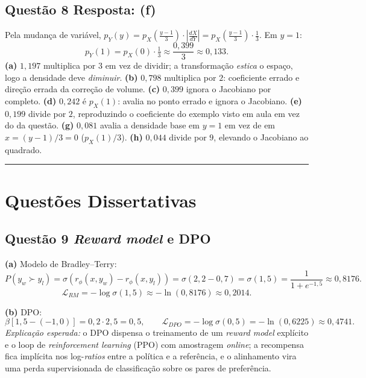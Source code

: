 \documentclass[11pt,a4paper]{article}
\begin{document}
\subsection*{Questão 8 \textemdash{} Resposta: (f)}
Pela mudança de variável, $p_Y(y) = p_X\!\left(\tfrac{y - 1}{3}\right) \cdot \left|\tfrac{dX}{dY}\right| = p_X\!\left(\tfrac{y - 1}{3}\right) \cdot \tfrac{1}{3}$. Em $y = 1$:
\[
p_Y(1) = p_X(0) \cdot \tfrac{1}{3} \approx \frac{0{,}399}{3} \approx 0{,}133.
\]
\textbf{(a)} $1{,}197$ multiplica por $3$ em vez de dividir; a transformação \emph{estica} o espaço, logo a densidade deve \emph{diminuir}.
\textbf{(b)} $0{,}798$ multiplica por $2$: coeficiente errado e direção errada da correção de volume.
\textbf{(c)} $0{,}399$ ignora o Jacobiano por completo.
\textbf{(d)} $0{,}242$ é $p_X(1)$: avalia no ponto errado e ignora o Jacobiano.
\textbf{(e)} $0{,}199$ divide por $2$, reproduzindo o coeficiente do exemplo visto em aula em vez do da questão.
\textbf{(g)} $0{,}081$ avalia a densidade base em $y = 1$ em vez de em $x = (y-1)/3 = 0$ ($p_X(1)/3$).
\textbf{(h)} $0{,}044$ divide por $9$, elevando o Jacobiano ao quadrado.

\color{black}
\rule{\linewidth}{0.4pt}

\section*{Questões Dissertativas}

\color{blue}

\subsection*{Questão 9 \textemdash{} \textit{Reward model} e DPO}

\textbf{(a)} Modelo de Bradley--Terry:
\[
P(y_w \succ y_l) = \sigma\!\left(r_\phi(x, y_w) - r_\phi(x, y_l)\right) = \sigma(2{,}2 - 0{,}7) = \sigma(1{,}5) = \frac{1}{1 + e^{-1{,}5}} \approx 0{,}8176.
\]
\[
\mathcal{L}_{RM} = -\log \sigma(1{,}5) \approx -\ln(0{,}8176) \approx 0{,}2014.
\]

\textbf{(b)} DPO:
\[
\beta\left[1{,}5 - (-1{,}0)\right] = 0{,}2 \cdot 2{,}5 = 0{,}5, \qquad
\mathcal{L}_{DPO} = -\log \sigma(0{,}5) = -\ln(0{,}6225) \approx 0{,}4741.
\]
\textit{Explicação esperada:} o DPO dispensa o treinamento de um \textit{reward model} explícito e o loop de \textit{reinforcement learning} (PPO) com amostragem \textit{online}; a recompensa fica implícita nos log-\textit{ratios} entre a política e a referência, e o alinhamento vira uma perda supervisionada de classificação sobre os pares de preferência.
\end{document}
